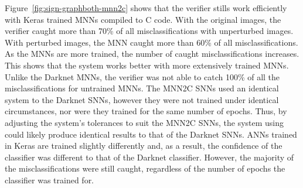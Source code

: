 Figure~\ref{fig:sign-graphboth-mnn2c} shows that the verifier stills work efficiently with Keras trained \acp{MNN} compiled to C code.
With the original images, the verifier caught more than 70\% of all misclassifications with unperturbed images.
With perturbed images, the \ac{MNN} caught more than 60\% of all misclassifications.
As the \acp{MNN} are more trained, the number of caught misclassifications increases.
This shows that the system works better with more extensively trained \acp{MNN}.
Unlike the Darknet \acp{MNN}, the verifier was not able to catch 100\% of all the misclassifications for untrained \acp{MNN}.
The \ac{MNN2C} \acp{SNN} used an identical system to the Darknet \acp{SNN}, however they were not trained under identical circumstances, nor were they trained for the same number of epochs.
Thus, by adjusting the system's tolerances to suit the \ac{MNN2C} \acp{SNN}, the system using could likely produce identical results to that of the Darknet \acp{SNN}.
\acp{ANN} trained in Keras are trained slightly differently and, as a result, the confidence of the classifier was different to that of the Darknet classifier.
However, the majority of the misclassifications were still caught, regardless of the number of epochs the classifier was trained for.





















